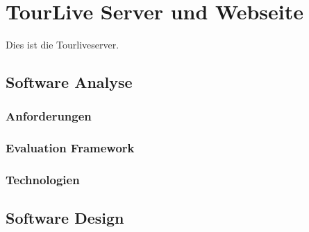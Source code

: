 \chapter{TourLive Server und Webseite}

Dies ist die Tourliveserver.


\section{Software Analyse}
\subsection{Anforderungen}


\subsection{Evaluation Framework}


\subsection{Technologien}


\section{Software Design}
